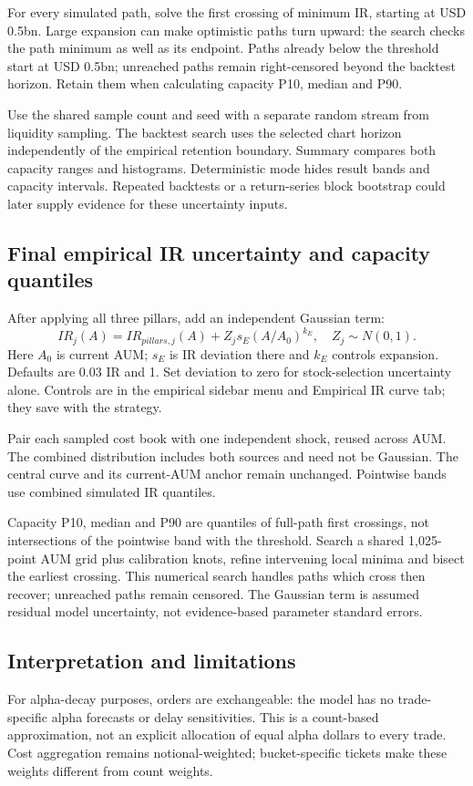 \documentclass[11pt,a4paper]{article}
\begin{document}
For every simulated path, solve the first crossing of minimum IR, starting at USD 0.5bn. Large expansion can make optimistic paths turn upward: the search checks the path minimum as well as its endpoint. Paths already below the threshold start at USD 0.5bn; unreached paths remain right-censored beyond the backtest horizon. Retain them when calculating capacity P10, median and P90.

Use the shared sample count and seed with a separate random stream from liquidity sampling. The backtest search uses the selected chart horizon independently of the empirical retention boundary. Summary compares both capacity ranges and histograms. Deterministic mode hides result bands and capacity intervals. Repeated backtests or a return-series block bootstrap could later supply evidence for these uncertainty inputs.

\subsection{Final empirical IR uncertainty and capacity quantiles}
After applying all three pillars, add an independent Gaussian term:
\[
IR_j(A)=IR_{pillars,j}(A)+Z_j s_E(A/A_0)^{k_E},\quad Z_j\sim N(0,1).
\]
Here $A_0$ is current AUM; $s_E$ is IR deviation there and $k_E$ controls expansion. Defaults are 0.03 IR and 1. Set deviation to zero for stock-selection uncertainty alone. Controls are in the empirical sidebar menu and Empirical IR curve tab; they save with the strategy.

Pair each sampled cost book with one independent shock, reused across AUM. The combined distribution includes both sources and need not be Gaussian. The central curve and its current-AUM anchor remain unchanged. Pointwise bands use combined simulated IR quantiles.

Capacity P10, median and P90 are quantiles of full-path first crossings, not intersections of the pointwise band with the threshold. Search a shared 1,025-point AUM grid plus calibration knots, refine intervening local minima and bisect the earliest crossing. This numerical search handles paths which cross then recover; unreached paths remain censored. The Gaussian term is assumed residual model uncertainty, not evidence-based parameter standard errors.

\newpage
\subsection{Interpretation and limitations}
For alpha-decay purposes, orders are exchangeable: the model has no trade-specific alpha forecasts or delay sensitivities. This is a count-based approximation, not an explicit allocation of equal alpha dollars to every trade. Cost aggregation remains notional-weighted; bucket-specific tickets make these weights different from count weights.
\end{document}
